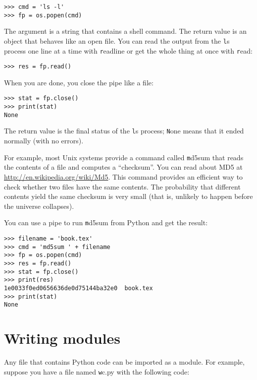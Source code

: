\documentclass[
DIV=11,
fontsize=12,
twoside,
headinclude=false,
titlepage=firstiscover,
abstract=true,
headsepline=true,
footsepline=true,
chapterprefix=true, %
headings=big,
bibliography=totoc,%
captions=tableheading
]{scrbook}
\theoremstyle{definition}
\begin{document}
\begin{lstlisting}
>>> cmd = 'ls -l'
>>> fp = os.popen(cmd)
\end{lstlisting}
%
The argument is a string that contains a shell command.  The
return value is an object that behaves like an open
file.  You can read the output from the {\texttt ls} process one
line at a time with {\texttt readline} or get the whole thing at
once with {\texttt read}:

\begin{lstlisting}
>>> res = fp.read()
\end{lstlisting}
%
When you are done, you close the pipe like a file:

\begin{lstlisting}
>>> stat = fp.close()
>>> print(stat)
None
\end{lstlisting}
%
The return value is the final status of the {\texttt ls} process;
{\texttt None} means that it ended normally (with no errors).

For example, most Unix systems provide a command called {\texttt md5sum}
that reads the contents of a file and computes a ``checksum''.
You can read about MD5 at \url{http://en.wikipedia.org/wiki/Md5}.  This
command provides an efficient way to check whether two files
have the same contents.  The probability that different contents
yield the same checksum is very small (that is, unlikely to happen
before the universe collapses).

You can use a pipe to run {\texttt md5sum} from Python and get the result:

\begin{lstlisting}
>>> filename = 'book.tex'
>>> cmd = 'md5sum ' + filename
>>> fp = os.popen(cmd)
>>> res = fp.read()
>>> stat = fp.close()
>>> print(res)
1e0033f0ed0656636de0d75144ba32e0  book.tex
>>> print(stat)
None
\end{lstlisting}



\section{Writing modules}
\label{modules}

Any file that contains Python code can be imported as a module.
For example, suppose you have a file named {\texttt wc.py} with the following
code:
\end{document}
